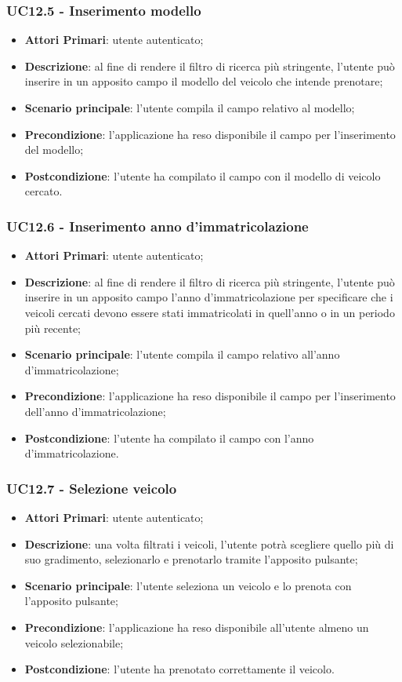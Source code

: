 \subsubsection{UC12.5 - Inserimento modello}
\begin{itemize}
	\item \textbf{Attori Primari}: utente autenticato;
	\item \textbf{Descrizione}: al fine di rendere il filtro di ricerca più stringente, l'utente può inserire in un apposito campo il modello del veicolo che intende prenotare;
	\item \textbf{Scenario principale}: l'utente compila il campo relativo al modello;	
	\item \textbf{Precondizione}: l'applicazione ha reso disponibile il campo per l'inserimento del modello;
	\item \textbf{Postcondizione}: l'utente ha compilato il campo con il modello di veicolo cercato.	
\end{itemize}
\subsubsection{UC12.6 - Inserimento anno d'immatricolazione}
\begin{itemize}
	\item \textbf{Attori Primari}: utente autenticato;
	\item \textbf{Descrizione}: al fine di rendere il filtro di ricerca più stringente, l'utente può inserire in un apposito campo l'anno d'immatricolazione per specificare che i veicoli cercati devono essere stati immatricolati in quell'anno o in un periodo più recente;
	\item \textbf{Scenario principale}: l'utente compila il campo relativo all'anno d'immatricolazione;	
	\item \textbf{Precondizione}: l'applicazione ha reso disponibile il campo per l'inserimento dell'anno d'immatricolazione;
	\item \textbf{Postcondizione}: l'utente ha compilato il campo con l'anno d'immatricolazione.	
\end{itemize}
\subsubsection{UC12.7 - Selezione veicolo}
\begin{itemize}
	\item \textbf{Attori Primari}: utente autenticato;
	\item \textbf{Descrizione}: una volta filtrati i veicoli, l'utente potrà scegliere quello più di suo gradimento, selezionarlo e prenotarlo tramite l'apposito pulsante;
	\item \textbf{Scenario principale}: 
	l'utente seleziona un veicolo e lo prenota con l'apposito pulsante;
	\item \textbf{Precondizione}: l'applicazione ha reso disponibile all'utente almeno un veicolo selezionabile;
	\item \textbf{Postcondizione}: l'utente ha prenotato correttamente il veicolo.
\end{itemize}

